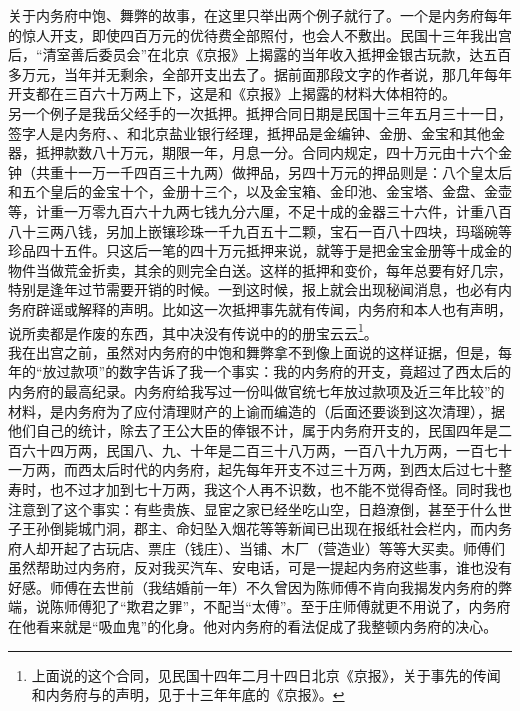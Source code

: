 关于内务府中饱、舞弊的故事，在这里只举出两个例子就行了。一个是内务府每年的惊人开支，即使四百万元的优待费全部照付，也会人不敷出。民国十三年我出宫后，“清室善后委员会”在北京《京报》上揭露的当年收入抵押金银古玩款，达五百多万元，当年并无剩余，全部开支出去了。据前面那段文字的作者说，那几年每年开支都在三百六十万两上下，这是和《京报》上揭露的材料大体相符的。\\

另一个例子是我岳父经手的一次抵押。抵押合同日期是民国十三年五月三十一日，签字人是内务府、、和北京盐业银行经理，抵押品是金编钟、金册、金宝和其他金器，抵押款数八十万元，期限一年，月息一分。合同内规定，四十万元由十六个金钟（共重十一万一千四百三十九两）做押品，另四十万元的押品则是：八个皇太后和五个皇后的金宝十个，金册十三个，以及金宝箱、金印池、金宝塔、金盘、金壶等，计重一万零九百六十九两七钱九分六厘，不足十成的金器三十六件，计重八百八十三两八钱，另加上嵌镶珍珠一千九百五十二颗，宝石一百八十四块，玛瑙碗等珍品四十五件。只这后一笔的四十万元抵押来说，就等于是把金宝金册等十成金的物件当做荒金折卖，其余的则完全白送。这样的抵押和变价，每年总要有好几宗，特别是逢年过节需要开销的时候。一到这时候，报上就会出现秘闻消息，也必有内务府辟谣或解释的声明。比如这一次抵押事先就有传闻，内务府和本人也有声明，说所卖都是作废的东西，其中决没有传说中的的册宝云云\footnote{上面说的这个合同，见民国十四年二月十四日北京《京报》，关于事先的传闻和内务府与的声明，见于十三年年底的《京报》。}。\\

我在出宫之前，虽然对内务府的中饱和舞弊拿不到像上面说的这样证据，但是，每年的“放过款项”的数字告诉了我一个事实：我的内务府的开支，竟超过了西太后的内务府的最高纪录。内务府给我写过一份叫做官统七年放过款项及近三年比较”的材料，是内务府为了应付清理财产的上谕而编造的（后面还要谈到这次清理），据他们自己的统计，除去了王公大臣的俸银不计，属于内务府开支的，民国四年是二百六十四万两，民国八、九、十年是二百三十八万两，一百八十九万两，一百七十一万两，而西太后时代的内务府，起先每年开支不过三十万两，到西太后过七十整寿时，也不过才加到七十万两，我这个人再不识数，也不能不觉得奇怪。同时我也注意到了这个事实：有些贵族、显宦之家已经坐吃山空，日趋潦倒，甚至于什么世子王孙倒毙城门洞，郡主、命妇坠入烟花等等新闻已出现在报纸社会栏内，而内务府人却开起了古玩店、票庄（钱庄）、当铺、木厂（营造业）等等大买卖。师傅们虽然帮助过内务府，反对我买汽车、安电话，可是一提起内务府这些事，谁也没有好感。师傅在去世前（我结婚前一年）不久曾因为陈师傅不肯向我揭发内务府的弊端，说陈师傅犯了“欺君之罪”，不配当“太傅”。至于庄师傅就更不用说了，内务府在他看来就是“吸血鬼”的化身。他对内务府的看法促成了我整顿内务府的决心。\\

